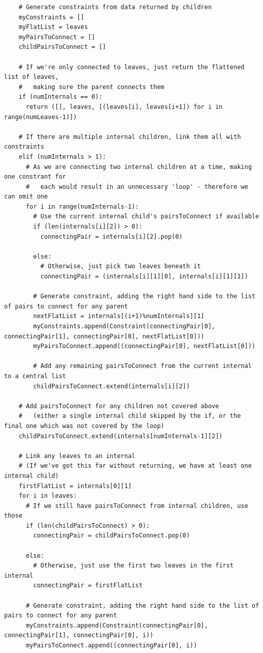 \documentclass[11pt]{article} %
\begin{document}
\begin{landscape}
\begin{lstlisting}
    # Generate constraints from data returned by children
    myConstraints = []
    myFlatList = leaves
    myPairsToConnect = []
    childPairsToConnect = []

    # If we're only connected to leaves, just return the flattened list of leaves,
    #   making sure the parent connects them
    if (numInternals == 0):
      return ([], leaves, [(leaves[i], leaves[i+1]) for i in range(numLeaves-1)])

    # If there are multiple internal children, link them all with constraints
    elif (numInternals > 1):
      # As we are connecting two internal children at a time, making one constrant for
      #   each would result in an unnecessary 'loop' - therefore we can omit one
      for i in range(numInternals-1):
        # Use the current internal child's pairsToConnect if available
        if (len(internals[i][2]) > 0):
          connectingPair = internals[i][2].pop(0)

        else:
          # Otherwise, just pick two leaves beneath it
          connectingPair = (internals[i][1][0], internals[i][1][1])
        
        # Generate constraint, adding the right hand side to the list of pairs to connect for any parent
        nextFlatList = internals[(i+1)%numInternals][1]
        myConstraints.append(Constraint(connectingPair[0], connectingPair[1], connectingPair[0], nextFlatList[0]))
        myPairsToConnect.append((connectingPair[0], nextFlatList[0]))

        # Add any remaining pairsToConnect from the current internal to a central list
        childPairsToConnect.extend(internals[i][2])
    
    # Add pairsToConnect for any children not covered above
    #   (either a single internal child skipped by the if, or the final one which was not covered by the loop)
    childPairsToConnect.extend(internals[numInternals-1][2])
    
    # Link any leaves to an internal
    # (If we've got this far without returning, we have at least one internal child)
    firstFlatList = internals[0][1]
    for i in leaves:
      # If we still have pairsToConnect from internal children, use those
      if (len(childPairsToConnect) > 0):
        connectingPair = childPairsToConnect.pop(0)
      
      else:
        # Otherwise, just use the first two leaves in the first internal
        connectingPair = firstFlatList
      
      # Generate constraint, adding the right hand side to the list of pairs to connect for any parent
      myConstraints.append(Constraint(connectingPair[0], connectingPair[1], connectingPair[0], i))
      myPairsToConnect.append((connectingPair[0], i))
    

\end{lstlisting}
\end{landscape}
\end{document}
